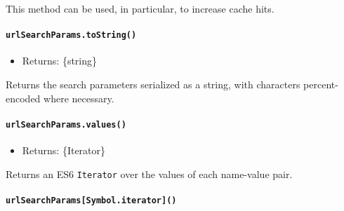 This method can be used, in particular, to increase cache hits.

\begin{Shaded}
\begin{Highlighting}[]
\OperatorTok{=}  \NormalTok{(}\NormalTok{)}\OperatorTok{;}
\NormalTok{()}\OperatorTok{;}
\NormalTok{())}\OperatorTok{;}
\end{Highlighting}
\end{Shaded}

\paragraph{\texorpdfstring{\texttt{urlSearchParams.toString()}}{urlSearchParams.toString()}}\label{urlsearchparams.tostring}

\begin{itemize}
\tightlist
\item
  Returns: \{string\}
\end{itemize}

Returns the search parameters serialized as a string, with characters
percent-encoded where necessary.

\paragraph{\texorpdfstring{\texttt{urlSearchParams.values()}}{urlSearchParams.values()}}\label{urlsearchparams.values}

\begin{itemize}
\tightlist
\item
  Returns: \{Iterator\}
\end{itemize}

Returns an ES6 \texttt{Iterator} over the values of each name-value
pair.

\paragraph{\texorpdfstring{\texttt{urlSearchParams{[}Symbol.iterator{]}()}}{urlSearchParams{[}Symbol.iterator{]}()}}\label{urlsearchparamssymbol.iterator}

